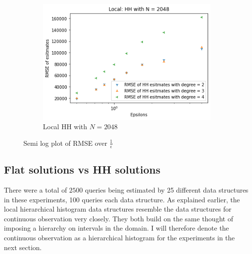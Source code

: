 \documentclass[11pt]{article}
\theoremstyle{definition}
\begin{document}
\begin{figure}[H]
\begin{subfigure}[b]{0.3\textwidth}
         \includegraphics[width=\textwidth]{figures/hh_loc_epsi/hh_lin_N=2048.png}
         \caption{Local HH with $N=2048$}
         \label{fig:f2}
     \end{subfigure}
        \caption{Semi log plot of RMSE over $\frac{1}{\epsilon}$}
        \label{fig:esp_loc_hh2}
\end{figure}


\newpage\subsection{Flat solutions vs HH solutions}
There were a total of $2500$ queries being estimated by 25 different data structures in these experiments, 100 queries each data structure. As explained earlier, the local hierarchical histogram data structures resemble the data structures for continuous observation very closely. They both build on the same thought of imposing a hierarchy on intervals in the domain. I will therefore denote the continuous observation as a hierarchical histogram for the experiments in the next section.
\end{document}
